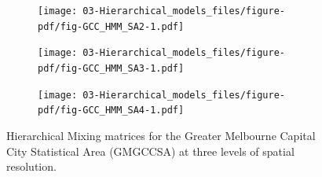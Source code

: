 \documentclass[
  letterpaper,
  DIV=11,
  numbers=noendperiod]{scrreprt}
\begin{document}
\begin{figure}

\begin{minipage}[t]{0.50\linewidth}

{\centering 

}

\end{minipage}%
%
\begin{minipage}[t]{0.50\linewidth}

{\centering 

\begin{figure}

{\centering \texttt{[image: 03-Hierarchical\_models\_files/figure-pdf/fig-GCC\_HMM\_SA2-1.pdf]}

}

\end{figure}

}

\end{minipage}%
\newline
\begin{minipage}[t]{0.50\linewidth}

{\centering 

\begin{figure}

{\centering \texttt{[image: 03-Hierarchical\_models\_files/figure-pdf/fig-GCC\_HMM\_SA3-1.pdf]}

}

\end{figure}

}

\end{minipage}%
%
\begin{minipage}[t]{0.50\linewidth}

{\centering 

\begin{figure}

{\centering \texttt{[image: 03-Hierarchical\_models\_files/figure-pdf/fig-GCC\_HMM\_SA4-1.pdf]}

}

\end{figure}

}

\end{minipage}%

\caption{\label{fig-GCC_HMM}Hierarchical Mixing matrices for the Greater
Melbourne Capital City Statistical Area (GMGCCSA) at three levels of
spatial resolution.}

\end{figure}
\end{document}
